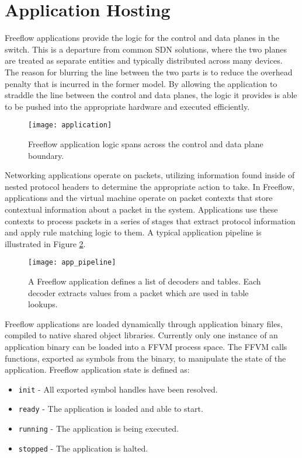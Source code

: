 \section{Application Hosting}
\label{ff:app}
Freeflow applications provide the logic for the control and data planes in the
switch. This is a departure from common SDN solutions, where the two planes are
treated as separate entities and typically distributed across many devices.
The reason for blurring the line between the two parts is to reduce the overhead
penalty that is incurred in the former model. By allowing the application to
straddle the line between the control and data planes, the logic it provides is
able to be pushed into the appropriate hardware and executed efficiently.

\begin{figure}[h]
\centering
\texttt{[image: application]}
\caption{Freeflow application logic spans across the control and data plane
boundary.}
\label{app}
\end{figure}

Networking applications operate on packets, utilizing information found inside
of nested protocol headers to determine the appropriate action to take. In
Freeflow, applications and the virtual machine operate on packet contexts
that store contextual information about a packet in the system. Applications
use these contexts to process packets in a series of stages that extract
protocol information and apply rule matching logic to them. A typical
application pipeline is illustrated in Figure \ref{app_pipeline}.

\begin{figure}[h]
\centering
\texttt{[image: app\_pipeline]}
\caption{A Freeflow application defines a list of decoders and tables.
Each decoder extracts values from a packet which are used in table lookups.}
\label{app_pipeline}
\end{figure}

Freeflow applications are loaded dynamically through application binary
files, compiled to native shared object libraries. Currently only one instance
of an application binary can be loaded into a FFVM process space. The FFVM
calls functions, exported as symbols from the binary, to manipulate the state
of the application. Freeflow application state is defined as:

\begin{itemize}
  \item \texttt{init} - All exported symbol handles have been resolved.
  \item \texttt{ready} - The application is loaded and able to start.
  \item \texttt{running} - The application is being executed.
  \item \texttt{stopped} - The application is halted.
\end{itemize}

